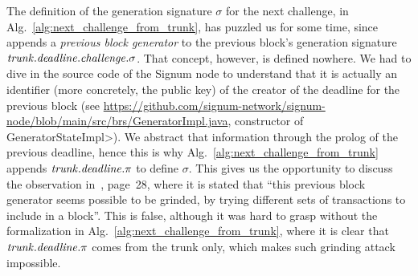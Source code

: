 The definition of the generation signature $\sigma$ for the next challenge,
in Alg.~\ref{alg:next_challenge_from_trunk},
has puzzled us for some time, since~\cite{SignumPlotting} appends a \emph{previous block generator}
to the previous block's generation signature ${\mathit{trunk}}.{\mathit{deadline}}.{\mathit{challenge}}.\sigma$.
That concept, however, is defined nowhere.
We had to dive in the source code of the Signum node
to understand that it is actually
an identifier (more concretely, the public key)
of the creator of the deadline for the previous block
(see \url{https://github.com/signum-network/signum-node/blob/main/src/brs/GeneratorImpl.java}, constructor of \<GeneratorStateImpl>).
We abstract that information through the prolog of the previous deadline, hence this is why
Alg.~\ref{alg:next_challenge_from_trunk} appends
${\mathit{trunk}}.{\mathit{deadline}}.\pi$ to define $\sigma$.
This gives us the opportunity to discuss the observation in~\cite{ParkPAFG15}, page~28,
where it is stated that ``this previous block generator seems possible to be grinded, by trying
different sets of transactions to include in a block''. This is false, although it was
hard to grasp without the formalization in
Alg.~\ref{alg:next_challenge_from_trunk}, where it is clear that
${\mathit{trunk}}.{\mathit{deadline}}.\pi$ comes from the trunk only, which makes
such grinding attack impossible.
